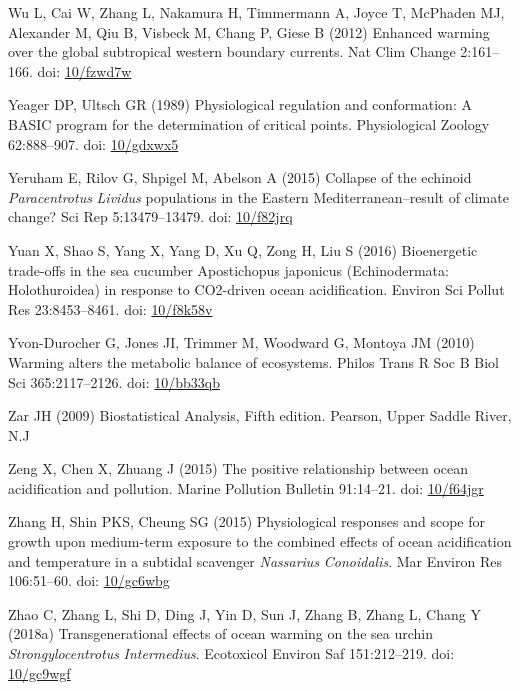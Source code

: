 \documentclass[a4paper,10pt, oneside]{memoir}
\begin{document}
\leavevmode\hypertarget{ref-Wu2012}{}%
Wu L, Cai W, Zhang L, Nakamura H, Timmermann A, Joyce T, McPhaden MJ, Alexander M, Qiu B, Visbeck M, Chang P, Giese B (2012) Enhanced warming over the global subtropical western boundary currents. Nat Clim Change 2:161--166. doi: \href{https://doi.org/10/fzwd7w}{10/fzwd7w}

\leavevmode\hypertarget{ref-Yeager1989}{}%
Yeager DP, Ultsch GR (1989) Physiological regulation and conformation: A BASIC program for the determination of critical points. Physiological Zoology 62:888--907. doi: \href{https://doi.org/10/gdxwx5}{10/gdxwx5}

\leavevmode\hypertarget{ref-Yeruham2015}{}%
Yeruham E, Rilov G, Shpigel M, Abelson A (2015) Collapse of the echinoid \emph{Paracentrotus} \emph{Lividus} populations in the Eastern Mediterranean--result of climate change? Sci Rep 5:13479--13479. doi: \href{https://doi.org/10/f82jrq}{10/f82jrq}

\leavevmode\hypertarget{ref-Yuan2016}{}%
Yuan X, Shao S, Yang X, Yang D, Xu Q, Zong H, Liu S (2016) Bioenergetic trade-offs in the sea cucumber Apostichopus japonicus (Echinodermata: Holothuroidea) in response to CO2-driven ocean acidification. Environ Sci Pollut Res 23:8453--8461. doi: \href{https://doi.org/10/f8k58v}{10/f8k58v}

\leavevmode\hypertarget{ref-Yvon-Durocher2010}{}%
Yvon-Durocher G, Jones JI, Trimmer M, Woodward G, Montoya JM (2010) Warming alters the metabolic balance of ecosystems. Philos Trans R Soc B Biol Sci 365:2117--2126. doi: \href{https://doi.org/10/bb33qb}{10/bb33qb}

\leavevmode\hypertarget{ref-Zar2009}{}%
Zar JH (2009) Biostatistical Analysis, Fifth edition. Pearson, Upper Saddle River, N.J

\leavevmode\hypertarget{ref-Zeng2015}{}%
Zeng X, Chen X, Zhuang J (2015) The positive relationship between ocean acidification and pollution. Marine Pollution Bulletin 91:14--21. doi: \href{https://doi.org/10/f64jgr}{10/f64jgr}

\leavevmode\hypertarget{ref-Zhang2015}{}%
Zhang H, Shin PKS, Cheung SG (2015) Physiological responses and scope for growth upon medium-term exposure to the combined effects of ocean acidification and temperature in a subtidal scavenger \emph{Nassarius} \emph{Conoidalis}. Mar Environ Res 106:51--60. doi: \href{https://doi.org/10/gc6wbg}{10/gc6wbg}

\leavevmode\hypertarget{ref-Zhao2018}{}%
Zhao C, Zhang L, Shi D, Ding J, Yin D, Sun J, Zhang B, Zhang L, Chang Y (2018a) Transgenerational effects of ocean warming on the sea urchin \emph{Strongylocentrotus} \emph{Intermedius}. Ecotoxicol Environ Saf 151:212--219. doi: \href{https://doi.org/10/gc9wgf}{10/gc9wgf}
\end{document}
